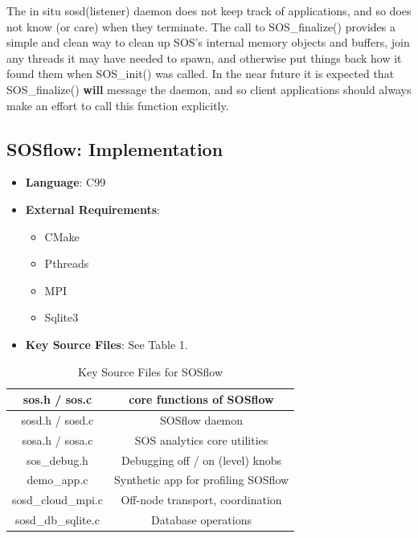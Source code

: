 The in situ sosd(listener) daemon does not keep track of applications,
and so does not know (or care) when they terminate.
%
The call to SOS\_finalize() provides a simple and clean way to clean
up SOS's internal memory objects and buffers, join any threads it may
have needed to spawn, and otherwise put things back how it found them
when SOS\_init() was called.
%
In the near future it is expected that SOS\_finalize() \textbf{will}
message the daemon, and so client applications should always make an
effort to call this function explicitly.

\subsection{SOSflow: Implementation}
%
\begin{itemize}
    \item \textbf{Language}: C99
    \item \textbf{External Requirements}:
      \begin{itemize}
          \item CMake
          \item Pthreads
          \item MPI
          \item Sqlite3
      \end{itemize}
  \item \textbf{Key Source Files}: See Table 1.
\end{itemize}

\begin{table}[!t]
\renewcommand{\arraystretch}{1.3}
\caption{Key Source Files for SOSflow}
\label{tableexample}
\centering
\begin{tabular}{|c|c|}
\hline %
sos.h / sos.c & core functions of SOSflow\\
\hline %
sosd.h / sosd.c & SOSflow daemon\\
\hline %
sosa.h / sosa.c & SOS analytics core utilities\\
\hline %
sos\_debug.h & Debugging off / on (level) knobs\\
\hline %
demo\_app.c & Synthetic app for profiling SOSflow\\
\hline %
sosd\_cloud\_mpi.c & Off-node transport, coordination\\
\hline %
sosd\_db\_sqlite.c & Database operations\\
\hline %
\end{tabular}
\end{table}


